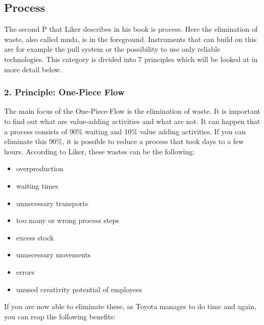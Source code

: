 \documentclass[a4paper,11pt]{article}
\begin{document}
\subsection{Process}

The second P that Liker describes in his book is process. Here the elimination
of waste, also called muda, is in the foreground. Instruments that can build
on this are for example the pull system or the possibility to use only
reliable technologies. This category is divided into 7 principles which will
be looked at in more detail below.

\subsubsection*{2. Principle: One-Piece Flow}

The main focus of the One-Piece-Flow is the elimination of waste. It is
important to find out what are value-adding activities and what are not. It
can happen that a process consists of 90\% waiting and 10\% value adding
activities. If you can eliminate this 90\%, it is possible to reduce a process
that took days to a few hours. According to Liker, these wastes can be the
following:

\begin{itemize}
\item overproduction
\item waiting times
\item unnecessary transports
\item too many or wrong process steps
\item excess stock
\item unnecessary movements
\item errors
\item unused creativity potential of employees
\end{itemize}

If you are now able to eliminate these, as Toyota manages to do time and
again, you can reap the following benefits:
\end{document}
